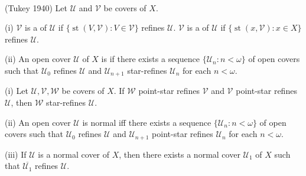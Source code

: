 \documentclass[main.tex]{subfiles}
\begin{document}
{ \label{def:1.1.6}
\textup{(\hstretch{1.8}{[}Tukey 1940\hstretch{1.8}{]}\textsuperscript{\cite{Tukey}})}
	Let $\mathscr{U}$ and $\mathscr{V}$ be covers of $X$.
	
\textup{(i)} $\mathscr{V}$ is a 
	of $\mathscr{U}$ if 
	$\{\operatorname{st}(V, \mathscr{V}): V\in \mathscr{V}\}$ refines $\mathscr{U}$.
	$\mathscr{V}$ is a 
	of $\mathscr{U}$ if 
	$\{\operatorname{st}(x, \mathscr{V}): x\in X\}$ refines $\mathscr{U}$.
	
\textup{(ii)} An open cover $\mathscr{U}$ of $X$ is 
	if there exists a sequence $\{ \mathscr{U}_n: n<\omega\}$ of open covers such that $\mathscr{U}_0$ refines $\mathscr{U}$ and $\mathscr{U}_{n+1}$ star-refines $\mathscr{U}_n$ for each $n<\omega$.
}%

{\lemma{\label{lem:1.1.7}}
	\textup{(i)} Let $\mathscr{U}, \mathscr{V}, \mathscr{W}$ be covers of $X$. If $\mathscr{W}$ point-star refines $\mathscr{V}$ and $\mathscr{V}$ point-star refines $\mathscr{U}$, then $\mathscr{W}$ star-refines $\mathscr{U}$.
	
	\textup{(ii)}  An open cover $\mathscr{U}$ is normal iff there exists a sequence 
	$\{\mathscr{U}_n: n<\omega\}$ of open covers such that $\mathscr{U}_0$ refines 
	$\mathscr{U}$ and  $\mathscr{U}_{n+1}$ point-star refines $\mathscr{U}_n$ for each $n<\omega$.
	
	\textup{(iii)}  If $\mathscr{U}$ is a normal cover of $X$, then there exists a normal cover $\mathscr{U}_1$ of $X$ such that $\overline{\mathscr{U}_1}$ refines $\mathscr{U}$.
} %
\end{document}
